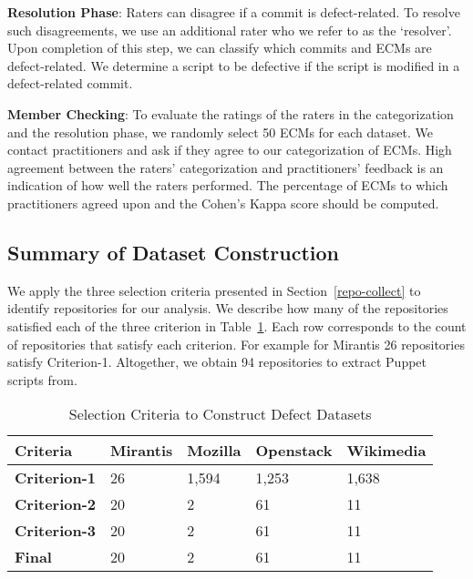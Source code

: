 \documentclass[smallextended]{svjour3}       %
\begin{document}
\textbf{Resolution Phase}: Raters can disagree if a commit is defect-related. To resolve such disagreements, we use an additional rater who we refer to as the `resolver'. Upon completion of this step, we can classify which commits and ECMs are defect-related. We determine a script to be defective if the script is modified in a defect-related commit.

\textbf{Member Checking}: To evaluate the ratings of the raters in the categorization and the resolution phase, we randomly select 50 ECMs for each dataset. We contact practitioners and ask if they agree to our categorization of ECMs. High agreement between the raters' categorization and practitioners' feedback is an indication of how well the raters performed. The percentage of ECMs to which practitioners agreed upon and the Cohen's Kappa score should be computed.


\subsection{Summary of Dataset Construction}
\label{dataset-results}

We apply the three selection criteria presented in Section~\ref{repo-collect} to identify repositories for our analysis. We describe how many of the repositories satisfied each of the three criterion in Table~\ref{table-criteria-dataset}. Each row corresponds to the count of repositories that satisfy each criterion. For example for Mirantis 26 repositories satisfy Criterion-1. Altogether, we obtain 94 repositories to extract Puppet scripts from. 

\begin{table}[]
\centering
\setlength\abovecaptionskip{-1pt}
\caption{Selection Criteria to Construct Defect Datasets}
\label{table-criteria-dataset}
{\footnotesize
\begin{tabular}{ p{1.75cm}  p{1.0cm} p{1.0cm} p{1.0cm} p{1.0cm} }
\hline
\textbf{Criteria}   & Mirantis & Mozilla & Openstack & Wikimedia \\
\hline
\textbf{Criterion-1} & 26 & 1,594 & 1,253 & 1,638 \\
\textbf{Criterion-2} & 20 & 2     & 61 & 11 \\
\textbf{Criterion-3} & 20 & 2     & 61 & 11 \\
\hline
\textbf{Final}      & 20 & 2     & 61 & 11 \\
\hline
\end{tabular}
}
\end{table}
\end{document}
